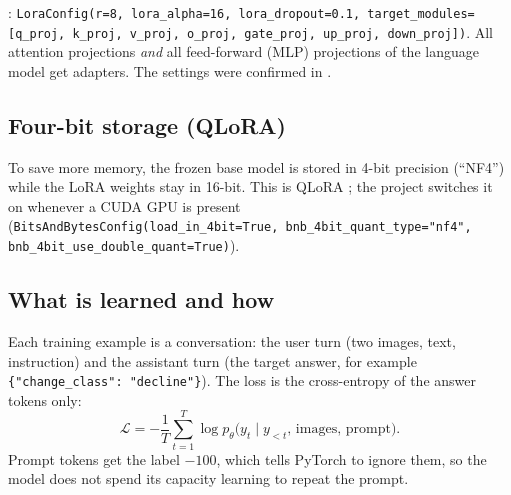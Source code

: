 \begin{wherecode}
: \texttt{LoraConfig(r=8, lora\_alpha=16, lora\_dropout=0.1, target\_modules=[q\_proj, k\_proj, v\_proj, o\_proj, gate\_proj, up\_proj, down\_proj])}. All attention projections \emph{and} all feed-forward (MLP) projections of the language model get adapters. The settings were confirmed in .
\end{wherecode}

\subsection{Four-bit storage (QLoRA)}

To save more memory, the frozen base model is stored in 4-bit precision (``NF4'') while the LoRA weights stay in 16-bit. This is QLoRA \citep{dettmers2023qlora}; the project switches it on whenever a CUDA GPU is present (\texttt{BitsAndBytesConfig(load\_in\_4bit=True, bnb\_4bit\_quant\_type="nf4", bnb\_4bit\_use\_double\_quant=True)}).

\subsection{What is learned and how}

Each training example is a conversation: the user turn (two images, text, instruction) and the assistant turn (the target answer, for example \texttt{\{"change\_class": "decline"\}}). The loss is the cross-entropy of the answer tokens only:
\begin{equation}
\mathcal{L} = -\frac{1}{T}\sum_{t=1}^{T}\log p_\theta\bigl(y_t \mid y_{<t},\,\text{images},\,\text{prompt}\bigr).
\end{equation}
Prompt tokens get the label $-100$, which tells PyTorch to ignore them, so the model does not spend its capacity learning to repeat the prompt.

